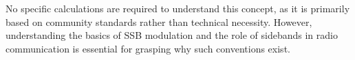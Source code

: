 No specific calculations are required to understand this concept, as it is primarily based on community standards rather than technical necessity. However, understanding the basics of SSB modulation and the role of sidebands in radio communication is essential for grasping why such conventions exist.

